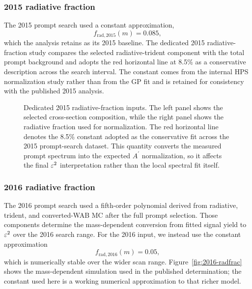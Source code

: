 \subsubsection{2015 radiative fraction}

The 2015 prompt search used a constant approximation,
\begin{equation}
f_{\mathrm{rad},2015}(m) = 0.085,
\end{equation}
which the analysis retains as its 2015 baseline. The dedicated 2015
radiative-fraction study compares the selected radiative-trident component with the
total prompt background and adopts the red horizontal line at 8.5\% as a conservative
description across the search interval. The constant comes from the internal HPS
normalization study rather than from the GP fit and is retained for consistency with
the published 2015 analysis.

\begin{figure}[H]
\centering
{}
\caption{Dedicated 2015 radiative-fraction inputs. The left panel shows the selected
cross-section composition, while the right panel shows the radiative fraction used for
normalization. The red horizontal line denotes the 8.5\% constant adopted as the
conservative fit across the 2015 prompt-search dataset. This quantity converts the
measured prompt spectrum into the expected $A^\prime$ normalization, so it affects the
final $\varepsilon^2$ interpretation rather than the local spectral fit itself.}
\label{fig:2015-radfrac}
\end{figure}

\subsubsection{2016 radiative fraction}

The 2016 prompt search used a fifth-order polynomial derived from radiative, trident,
and converted-WAB MC after the full prompt selection. Those components determine the
mass-dependent conversion from fitted signal yield to $\varepsilon^2$ over the 2016 search
range. For the 2016 input, we instead use the constant approximation
\begin{equation}
f_{\mathrm{rad},2016}(m) = 0.05,
\end{equation}
which is numerically stable over the wider scan range. Figure~\ref{fig:2016-radfrac}
shows the mass-dependent simulation used in the published determination; the constant
used here is a working numerical approximation to that richer model.

